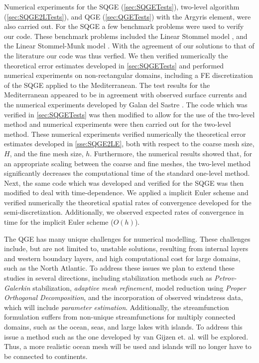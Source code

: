 Numerical experiments for the SQGE (\autoref{sec:SQGETests}), two-level
algorithm (\autoref{sec:SQGE2LTests}), and QGE (\autoref{sec:QGETests}) with the
Argyris element, were also carried out. For the SQGE a few benchmark problems
were used to verify our code. These benchmark problems included the Linear
Stommel model \cite{Vallis06,Myers}, and the Linear Stommel-Munk model
\cite{Cascon}. With the agreement of our solutions to that of the literature our
code was thus verfied. We then verified numerically the theoretical error
estimates developed in \autoref{sec:SQGETests} and performed numerical
experiments on non-rectangular domains, including a FE discretization of the
SQGE applied to the Mediterranean. The test results for the Mediterranean appeared
to be in agreement with observed surface currents and the numerical experiments
developed by Galan del Sastre \cite{Galan-del-Sastre2004}. The code which was
verified in \autoref{sec:SQGETests} was then modified to allow for the use of
the two-level method and numerical experiments were then carried out for the
two-level method.  These numerical experiments verified numerically the
theoretical error estimates developed in \autoref{sse:SQGE2LE}, both with
respect to the coarse mesh size, $H$, and the fine mesh size, $h$.  Furthermore,
the numerical results showed that, for an appropriate scaling between the coarse
and fine meshes, the two-level method significantly decreases the computational
time of the standard one-level method. Next, the same code which was developed
and verified for the SQGE was then modified to deal with time-dependence. We
applied a implicit Euler scheme and verified numerically the theoretical spatial
rates of convergence developed for the semi-discretization. Additionally, we
observed expected rates of convergence in time for the implicit Euler scheme
($O(h)$).

The QGE has many unique challenges for numerical modelling. These challenges
include, but are not limited to, unstable solutions, resulting from internal
layers and western boundary layers, and high computational cost for large
domains, such as the North Atlantic. To address these issues we plan to extend
these studies in several directions, including stabilization methods such as
\emph{Petrov-Galerkin} stabilization, \emph{adaptive mesh refinement}, model
reduction using \emph{Proper Orthogonal Decomposition}, and the incorporation of
observed windstress data, which will include \emph{parameter estimation}.
Additionally, the streamfunction formulation suffers from non-unique
streamfunctions for multiply connected domains, such as the ocean, seas, and
large lakes with islands. To address this issue a method such as the one
developed by van Gijzen et. al. \cite{van-Gijzen1998} will be explored.  Thus, a
more realistic ocean mesh will be used and islands will no longer have to be
connected to continents.
